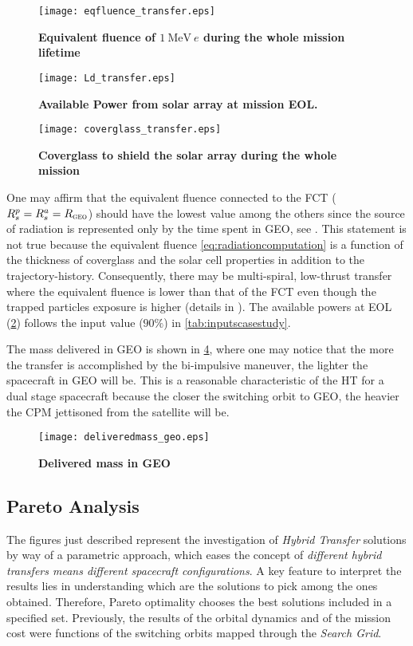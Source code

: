 %
\begin{figure}[htp]
\centering
\texttt{[image: eqfluence\_transfer.eps]}
\caption{\textbf{Equivalent fluence of $1~\si{\mega\electronvolt}~e$ during the whole mission lifetime}}
\label{fig:equivalentfluencewholemission}
\end{figure}
%
\begin{figure}[htp]
\centering
\texttt{[image: Ld\_transfer.eps]}
\caption{\textbf{Available Power from solar array at mission EOL.}}
\label{fig:ldwholemission}
\end{figure}
%
\begin{figure}[htp]
\centering
\texttt{[image: coverglass\_transfer.eps]}
\caption{\textbf{Coverglass to shield the solar array during the whole mission}}
\label{fig:coverglasswholemission}
\end{figure}
%
One may affirm that the equivalent fluence connected to the FCT ($R_s^p = R_s^a = R_{\textsc{geo}}$) should have the lowest value among the others since the source of radiation is represented only by the time spent in GEO, see . 
This statement is not true because the equivalent fluence \eqref{eq:radiationcomputation} is a function of the thickness of coverglass and the solar cell properties in addition to the trajectory-history. 
Consequently, there may be multi-spiral, low-thrust transfer where the equivalent fluence is lower than that of the FCT even though the trapped particles exposure is higher (details in \cite{tesisimo}). The available powers at EOL (\figurename\ref{fig:ldwholemission}) follows the input value ($90\%$) in \tablename\ref{tab:inputscasestudy}.

The mass delivered in GEO is shown in \figurename\ref{fig:deliveredmassingeo}, where one may notice that the more the transfer is accomplished by the bi-impulsive maneuver, the lighter the spacecraft in GEO will be. This is a reasonable characteristic of the HT for a dual stage spacecraft because the closer the switching orbit to GEO, the heavier the CPM jettisoned from the satellite will be.
%
\begin{figure}[htp]
\centering
\texttt{[image: deliveredmass\_geo.eps]}
\caption{\textbf{Delivered mass in GEO}}
\label{fig:deliveredmassingeo}
\end{figure}
%
\subsection{Pareto Analysis}
\label{subsec:paretonalaysis}
The figures just described represent the investigation of \emph{Hybrid Transfer} solutions by way of a parametric approach, which eases the concept of \emph{different hybrid transfers means different spacecraft configurations}. 
A key feature to interpret the results lies in understanding which are the solutions to pick among the ones obtained.
Therefore, Pareto optimality chooses the best solutions included in a specified set.
Previously, the results of the orbital dynamics and of the mission cost were functions of the switching orbits mapped through the \emph{Search Grid}.

